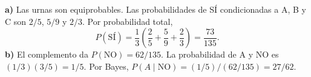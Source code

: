 \textbf{a)} Las urnas son equiprobables. Las probabilidades
de SÍ condicionadas a A, B y C son $2/5$, $5/9$ y $2/3$.
Por probabilidad total,
\[
P(\text{SÍ})=\frac13\left(\frac25+\frac59+\frac23\right)
=\boxed{\frac{73}{135}}.
\]
\textbf{b)} El complemento da $P(\text{NO})=62/135$.
La probabilidad de A y NO es $(1/3)(3/5)=1/5$.
Por Bayes, $P(A\mid\text{NO})=(1/5)/(62/135)=\boxed{27/62}$.
